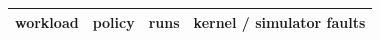 \begin{tabular}{llrr}
\toprule
workload & policy & runs & kernel / simulator faults \\
\midrule
\bottomrule
\end{tabular}
